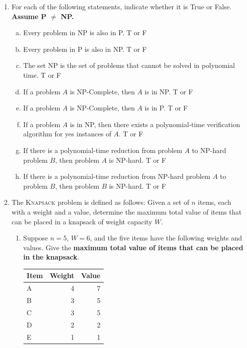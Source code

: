 \documentclass[11pt]{article}
\begin{document}
\begin{enumerate}
\item
For each of the following statements, indicate whether it is True or False.
\textbf{Assume P $\neq$ NP.}

\begin{enumerate}[(a)]
    \item Every problem in NP is also in P. T or F
    \item Every problem in P is also in NP. T or F
    \item The set NP is the set of problems that cannot be solved in polynomial time. T or F
    \item If a problem $A$ is NP-Complete, then $A$ is in NP. T or F
    \item If a problem $A$ is NP-Complete, then $A$ is in P. T or F
    \item If a problem $A$ is in NP, then there exists a polynomial-time
    verification algorithm for yes instances of $A$. T or F
    \item If there is a polynomial-time reduction from problem $A$ to NP-hard problem $B$,
    then problem $A$ is NP-hard. T or F
    \item If there is a polynomial-time reduction from NP-hard problem $A$ to problem $B$,
    then problem $B$ is NP-hard. T or F

\end{enumerate}

\item The \textsc{Knapsack} problem is defined as follows:
Given a set of $n$ items, each with a weight and a value,
determine the maximum total value of items that can be placed in a knapsack
of weight capacity $W$.

\begin{enumerate}
    \item Suppose $n=5$, $W=6$, and the five items have the following weights and values. Give
    the \textbf{maximum total value of items that can be placed in the knapsack}.

    \begin{tabular}{lrr}
        Item & Weight & Value \\
        \hline
        A & 4 & 7 \\
        B & 3 & 5 \\
        C & 3 & 5 \\
        D & 2 & 2 \\
        E & 1 & 1 \\
    \end{tabular}


\end{enumerate}
\end{enumerate}
\end{document}

